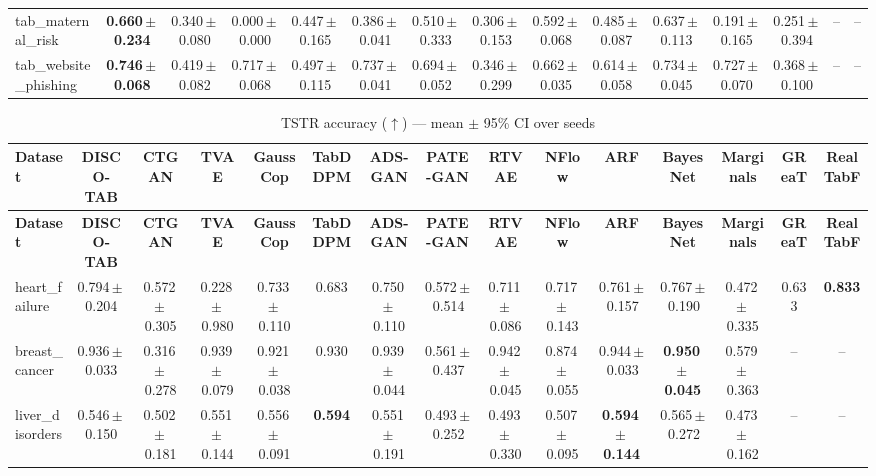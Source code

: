 \documentclass[8pt]{extarticle}
\begin{document}
\begin{longtable}{l*{14}{c}}
tab\_maternal\_risk & \textbf{0.660\,$\pm$\,0.234} & 0.340\,$\pm$\,0.080 & 0.000\,$\pm$\,0.000 & 0.447\,$\pm$\,0.165 & 0.386\,$\pm$\,0.041 & 0.510\,$\pm$\,0.333 & 0.306\,$\pm$\,0.153 & 0.592\,$\pm$\,0.068 & 0.485\,$\pm$\,0.087 & 0.637\,$\pm$\,0.113 & 0.191\,$\pm$\,0.165 & 0.251\,$\pm$\,0.394 & -- & -- \\
tab\_website\_phishing & \textbf{0.746\,$\pm$\,0.068} & 0.419\,$\pm$\,0.082 & 0.717\,$\pm$\,0.068 & 0.497\,$\pm$\,0.115 & 0.737\,$\pm$\,0.041 & 0.694\,$\pm$\,0.052 & 0.346\,$\pm$\,0.299 & 0.662\,$\pm$\,0.035 & 0.614\,$\pm$\,0.058 & 0.734\,$\pm$\,0.045 & 0.727\,$\pm$\,0.070 & 0.368\,$\pm$\,0.100 & -- & -- \\
\end{longtable}
\begin{longtable}{l*{14}{c}}
\caption{TSTR accuracy ($\uparrow$) --- mean $\pm$ 95\% CI over seeds}\\
\toprule
\textbf{Dataset} & \textbf{DISCO-TAB} & \textbf{CTGAN} & \textbf{TVAE} & \textbf{GaussCop} & \textbf{TabDDPM} & \textbf{ADS-GAN} & \textbf{PATE-GAN} & \textbf{RTVAE} & \textbf{NFlow} & \textbf{ARF} & \textbf{BayesNet} & \textbf{Marginals} & \textbf{GReaT} & \textbf{RealTabF} \\
\midrule
\endfirsthead
\toprule
\textbf{Dataset} & \textbf{DISCO-TAB} & \textbf{CTGAN} & \textbf{TVAE} & \textbf{GaussCop} & \textbf{TabDDPM} & \textbf{ADS-GAN} & \textbf{PATE-GAN} & \textbf{RTVAE} & \textbf{NFlow} & \textbf{ARF} & \textbf{BayesNet} & \textbf{Marginals} & \textbf{GReaT} & \textbf{RealTabF} \\
\midrule
\endhead
\bottomrule
\endfoot
heart\_failure & 0.794\,$\pm$\,0.204 & 0.572\,$\pm$\,0.305 & 0.228\,$\pm$\,0.980 & 0.733\,$\pm$\,0.110 & 0.683 & 0.750\,$\pm$\,0.110 & 0.572\,$\pm$\,0.514 & 0.711\,$\pm$\,0.086 & 0.717\,$\pm$\,0.143 & 0.761\,$\pm$\,0.157 & 0.767\,$\pm$\,0.190 & 0.472\,$\pm$\,0.335 & 0.633 & \textbf{0.833} \\
breast\_cancer & 0.936\,$\pm$\,0.033 & 0.316\,$\pm$\,0.278 & 0.939\,$\pm$\,0.079 & 0.921\,$\pm$\,0.038 & 0.930 & 0.939\,$\pm$\,0.044 & 0.561\,$\pm$\,0.437 & 0.942\,$\pm$\,0.045 & 0.874\,$\pm$\,0.055 & 0.944\,$\pm$\,0.033 & \textbf{0.950\,$\pm$\,0.045} & 0.579\,$\pm$\,0.363 & -- & -- \\
liver\_disorders & 0.546\,$\pm$\,0.150 & 0.502\,$\pm$\,0.181 & 0.551\,$\pm$\,0.144 & 0.556\,$\pm$\,0.091 & \textbf{0.594} & 0.551\,$\pm$\,0.191 & 0.493\,$\pm$\,0.252 & 0.493\,$\pm$\,0.330 & 0.507\,$\pm$\,0.095 & \textbf{0.594\,$\pm$\,0.144} & 0.565\,$\pm$\,0.272 & 0.473\,$\pm$\,0.162 & -- & -- \\

\end{longtable}
\end{document}
